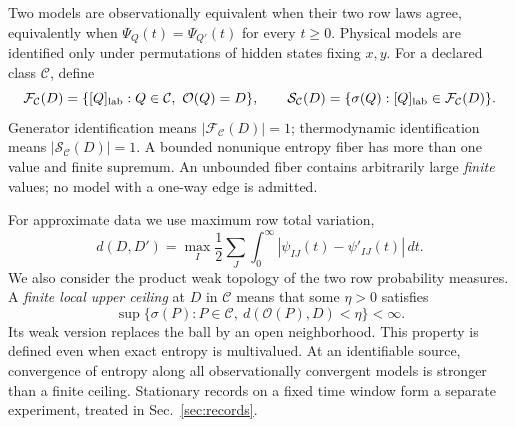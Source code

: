 \documentclass[aps,pre,onecolumn,11pt,longbibliography,notitlepage]{revtex4-2}
\newcommand{\1}{\mathbf 1}
\newcommand{\C}{\mathcal C}
\newcommand{\Obs}{\mathcal O}
\newcommand{\F}{\mathcal F}
\newcommand{\Ent}{\mathcal S}
\newcommand{\sig}{\sigma}
\begin{document}
Two models are observationally equivalent when their two row laws agree, equivalently when $\Psi_Q(t)=\Psi_{Q'}(t)$ for every $t\ge0$. Physical models are identified only under permutations of hidden states fixing $x,y$. For a declared class $\C$, define
\begin{equation}
 \F_{\C}(D)=\{[Q]_{\rm lab}:Q\in\C,\ \Obs(Q)=D\},\qquad
 \Ent_{\C}(D)=\{\sig(Q):[Q]_{\rm lab}\in\F_{\C}(D)\}.\label{eq:fibers}
\end{equation}
Generator identification means $|\F_\C(D)|=1$; thermodynamic identification means $|\Ent_\C(D)|=1$. A bounded nonunique entropy fiber has more than one value and finite supremum. An unbounded fiber contains arbitrarily large \emph{finite} values; no model with a one-way edge is admitted.

For approximate data we use maximum row total variation,
\begin{equation}
 d(D,D')=\max_I\frac12\sum_J\int_0^\infty
 |\psi_{IJ}(t)-\psi'_{IJ}(t)|\,dt.\label{eq:tv}
\end{equation}
We also consider the product weak topology of the two row probability measures. A \emph{finite local upper ceiling} at $D$ in $\C$ means that some $\eta>0$ satisfies
\begin{equation}
 \sup\{\sig(P):P\in\C,\ d(\Obs(P),D)<\eta\}<\infty.\label{eq:ceiling}
\end{equation}
Its weak version replaces the ball by an open neighborhood. This property is defined even when exact entropy is multivalued. At an identifiable source, convergence of entropy along all observationally convergent models is stronger than a finite ceiling. Stationary records on a fixed time window form a separate experiment, treated in Sec.~\ref{sec:records}.
\end{document}
